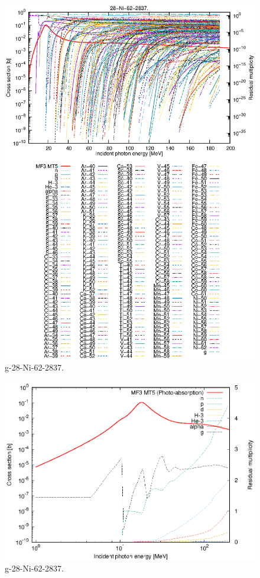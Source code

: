 \begin{figure}
 \includegraphics[width=\linewidth]{eps/g_28-Ni-62_2837.eps}
  \caption{g-28-Ni-62-2837.}
\end{figure}
\newpage \clearpage

\begin{figure}
 \includegraphics[width=\linewidth]{eps-log/g_28-Ni-62_2837.eps}
 \caption{g-28-Ni-62-2837.}
\end{figure}
\newpage \clearpage

